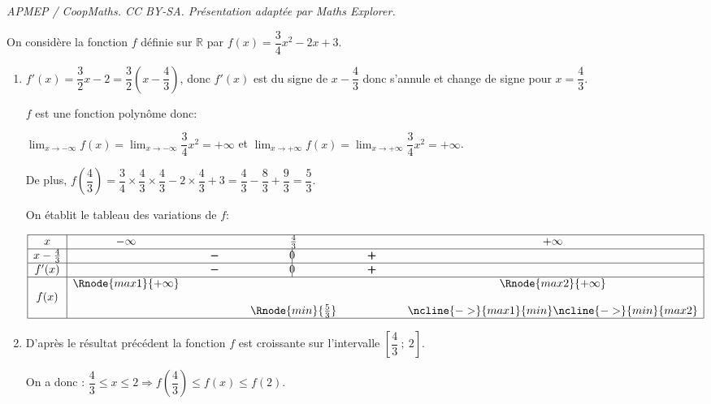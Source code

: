 \documentclass[10pt]{article}
\providecommand{\R}{\mathbb{R}}
\providecommand{\ds}{\displaystyle}
\begin{document}
\noindent\textit{APMEP / CoopMaths. CC BY-SA. Présentation adaptée par Maths Explorer.}\par\medskip
\medskip

On considère la fonction $f$ définie sur $\R$ par 
$f(x) = \dfrac34 x^2 - 2x + 3.$

\begin{enumerate}
\item 
$f'(x)=\dfrac{3}{2}x -2 = \dfrac{3}{2}\left (x-\dfrac{4}{3}\right )$, donc $f'(x)$ est du signe de $x-\dfrac{4}{3}$ donc s'annule et change de signe pour $x=\dfrac{4}{3}$.

$f$ est une fonction polynôme donc:

$\ds\lim_{x\to -\infty} f(x) = \ds\lim_{x\to -\infty} \dfrac{3}{4}x^2 = +\infty$
et
$\ds\lim_{x\to +\infty} f(x) = \ds\lim_{x\to +\infty} \dfrac{3}{4}x^2 = +\infty$.

De plus, $f\left(\dfrac43\right) = \dfrac34 \times \dfrac43 \times \dfrac43 - 2\times \dfrac43 + 3 = \dfrac43 - \dfrac83 + \dfrac93 = \dfrac53$.

On établit le tableau des variations de $f$:

\begin{center}
{\renewcommand{\arraystretch}{1.3}
\def\esp{\hspace*{1.5cm}}
\def\hauteur{0pt}
$\begin{array}{|c| *4{c} c|}
\hline
 x & -\infty & \esp & \frac{4}{3} & \esp & +\infty \\
\hline
x-\frac{4}{3} &  &  \pmb{-} & \vline\hspace{-2.7pt}0 & \pmb{+} & \\
 \hline
f'(x) &  &  \pmb{-} & \vline\hspace{-2.7pt}0 & \pmb{+} & \\  
\hline
  & \Rnode{max1}{+\infty}  &  &  &  & \Rnode{max2}{+\infty}   \\
f(x) & &  & & &  \rule{0pt}{\hauteur} \\
 &  & &   \Rnode{min}{\frac{5}{3}} & & \rule{0pt}{\hauteur}
\ncline{->}{max1}{min} \ncline{->}{min}{max2}\\
\hline
\end{array}$
}
\end{center}

\item 
D'après le résultat précédent la fonction $f$ est croissante sur l'intervalle $\left[\dfrac43~;~2\right]$.

On a donc : $\dfrac43 \leqslant x \leqslant 2 \Longrightarrow f\left(\dfrac43\right) \leqslant f(x) \leqslant f(2)$.


\end{enumerate}
\end{document}
